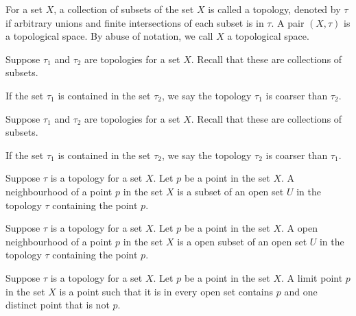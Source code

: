 \begin{definition}
	\label{definition-topological-space}
	For a set $X$, a collection of subsets 
	of the set $X$ is called a topology, denoted by $\tau$ 
	if arbitrary unions and finite intersections of each subset
	is in $\tau$. A pair $(X, \tau)$ is a topological space.
	By abuse of notation, we call $X$ a topological space.
\end{definition}

\begin{definition}[Coarser]
	\label{definition-coarser}
	Suppose $\tau_1$ and $\tau_2$ are topologies for a set $X$.
	Recall that these are collections of subsets.
	
	If the set $\tau_1$ is contained in the set $\tau_2$, we say the topology 
	$\tau_1$ is coarser than $\tau_2$.
\end{definition}

\begin{definition}[Finer]
	\label{definition-finer}
	Suppose $\tau_1$ and $\tau_2$ are topologies for a set $X$.
	Recall that these are collections of subsets.
	
	If the set $\tau_1$ is contained in the set $\tau_2$, we say the topology 
	$\tau_2$ is coarser than $\tau_1$.
\end{definition}

\begin{definition}[Neighbourhood]
	\label{definition-neighbourhood}
	Suppose $\tau$ is a topology for a set $X$.
	Let $p$ be a point in the set $X$.
	A neighbourhood of a point $p$ in the set $X$ is a subset of an open set $U$ in the topology $\tau$ containing the point $p$.
\end{definition}

\begin{definition}
	\label{definition-open-neighbourhood}
	Suppose $\tau$ is a topology for a set $X$.
	Let $p$ be a point in the set $X$.
	A open neighbourhood of a point $p$ in the set $X$ is a open subset of an open set $U$ in the topology $\tau$ containing the point $p$.
\end{definition}

\begin{definition}
	\label{definition-limit-point}
	Suppose $\tau$ is a topology for a set $X$.
	Let $p$ be a point in the set $X$.
	A limit point $p$ in the set $X$ is a point such that it is in every open set contains $p$ and one distinct point that is not $p$.
\end{definition}


